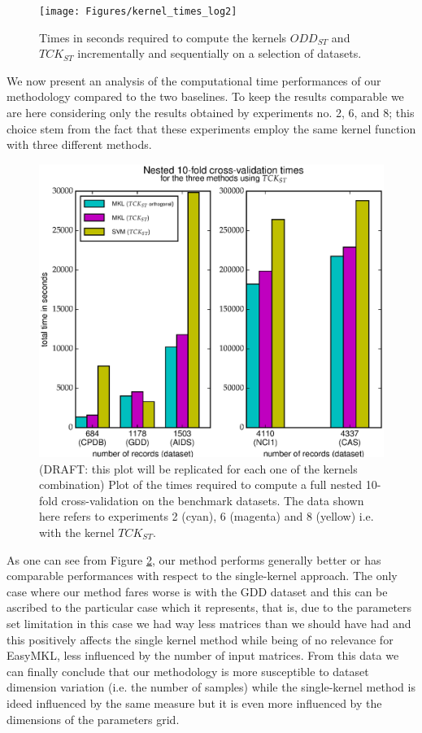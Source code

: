 \begin{figure}[ht]
    \centering
    \texttt{[image: Figures/kernel\_times\_log2]}
    \caption{Times in seconds required to compute the kernels $ODD_{ST}$ and 
    $TCK_{ST}$ incrementally and sequentially on a selection of datasets.}
    \label{fig:times}
\end{figure}

We now present an analysis of the computational time performances of our methodology
compared to the two baselines. To keep the results comparable we are here considering
only the results obtained by experiments no. 2, 6, and 8; this choice stem from the fact
that these experiments employ the same kernel function with three different methods.

\begin{figure}[ht]
    \centering
    \includegraphics[scale=0.7]{Figures/total_times}
    \caption{(DRAFT: this plot will be replicated for each one of the kernels combination)
        Plot of the times required to compute a full nested
        10-fold cross-validation on the benchmark datasets.
        The data shown here refers to experiments 2 (cyan), 6 (magenta) and 8 (yellow)
        i.e. with the kernel $TCK_{ST}$.
    }
    \label{fig:datasetstimes}
\end{figure}

As one can see from Figure \ref{fig:datasetstimes}, our method performs generally
better or has comparable performances with respect to the single-kernel approach.
The only case where our method fares worse is with the GDD dataset and this can be
ascribed to the particular case which it represents, that is, due to the parameters
set limitation in this case we had way less matrices than we should have had and
this positively affects the single kernel method while being of no relevance for
EasyMKL, less influenced by the number of input matrices.
From this data we can finally conclude that our methodology is more susceptible
to dataset dimension variation (i.e. the number of samples) while the single-kernel
method is ideed influenced by the same measure but it is even more influenced by
the dimensions of the parameters grid.

